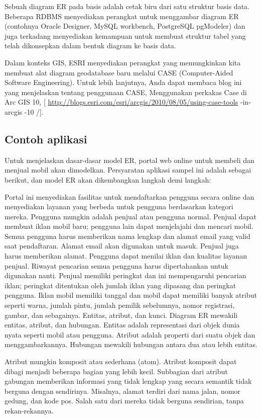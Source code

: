 \documentclass[]{book}
\begin{document}
Sebuah diagram ER pada basis adalah cetak biru dari satu struktur basis data. Beberapa RDBMS menyediakan perangkat untuk menggambar diagram ER (contohnya Oracle Designer, MySQL workbench, PostgreSQL pgModeler) dan juga terkadang menyediakan kemampuan untuk membuat struktur tabel yang telah dikonsepkan dalam bentuk diagram ke basis data.

Dalam konteks GIS, ESRI menyediakan perangkat yang memungkinkan kita membuat alat diagram geodatabase baru melalui CASE (Computer-Aided Software Engineering). Untuk lebih lanjutnya, Anda dapat membaca blog ini yang menjelaskan tentang penggunaan CASE, Menggunakan perkakas Case di Arc GIS 10, {[} \url{http://blogs.esri.com/esri/arcgis/2010/08/05/using-case-tools} -in-arcgis -10 /{]}.

\hypertarget{contoh-aplikasi}{%
\subsection{Contoh aplikasi}\label{contoh-aplikasi}}

Untuk menjelaskan dasar-dasar model ER, portal web online untuk membeli dan menjual mobil akan dimodelkan. Persyaratan aplikasi sampel ini adalah sebagai berikut, dan model ER akan dikembangkan langkah demi langkah:

Portal ini menyediakan fasilitas untuk mendaftarkan pengguna secara online dan menyediakan layanan yang berbeda untuk pengguna berdasarkan kategori mereka. Pengguna mungkin adalah penjual atau pengguna normal. Penjual dapat membuat iklan mobil baru; pengguna lain dapat menjelajahi dan mencari mobil. Semua pengguna harus memberikan nama lengkap dan alamat email yang valid saat pendaftaran. Alamat email akan digunakan untuk masuk. Penjual juga harus memberikan alamat. Pengguna dapat menilai iklan dan kualitas layanan penjual. Riwayat pencarian semua pengguna harus dipertahankan untuk digunakan nanti. Penjual memiliki peringkat dan ini mempengaruhi pencarian iklan; peringkat ditentukan oleh jumlah iklan yang dipasang dan peringkat pengguna. Iklan mobil memiliki tanggal dan mobil dapat memiliki banyak atribut seperti warna, jumlah pintu, jumlah pemilik sebelumnya, nomor registrasi, gambar, dan sebagainya. Entitas, atribut, dan kunci. Diagram ER mewakili entitas, atribut, dan hubungan. Entitas adalah representasi dari objek dunia nyata seperti mobil atau pengguna. Atribut adalah properti dari suatu objek dan menggambarkannya. Hubungan mewakili hubungan antara dua atau lebih entitas.

Atribut mungkin komposit atau sederhana (atom). Atribut komposit dapat dibagi menjadi beberapa bagian yang lebih kecil. Subbagian dari atribut gabungan memberikan informasi yang tidak lengkap yang secara semantik tidak berguna dengan sendirinya. Misalnya, alamat terdiri dari nama jalan, nomor gedung, dan kode pos. Salah satu dari mereka tidak berguna sendirian, tanpa rekan-rekannya.
\end{document}
